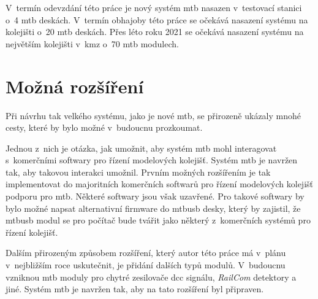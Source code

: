 V~termín odevzdání této práce je nový systém \gls{mtb} nasazen v~testovací
stanici o~4 \gls{mtb} deskách. V~termín obhajoby této práce se očekává nasazení
systému na kolejišti o~20 \gls{mtb} deskách. Přes léto roku 2021 se očekává
nasazení systému na největším kolejišti v~\gls{kmz} o~70 \gls{mtb} modulech.

\section{Možná rozšíření}

Při návrhu tak velkého systému, jako je nové \gls{mtb}, se přirozeně ukázaly
mnohé cesty, které by bylo možné v~budoucnu prozkoumat.

Jednou z~nich je otázka, jak umožnit, aby systém \gls{mtb} mohl interagovat
s~komerčními softwary pro řízení modelových kolejišť. Systém \gls{mtb} je navržen
tak, aby takovou interakci umožnil. Prvním možných rozšířením je tak implementovat
do majoritních komerčních softwarů pro řízení modelových kolejišť podporu
pro \gls{mtb}. Některé softwary jsou však uzavřené. Pro takové softwary by bylo
možné napsat alternativní firmware do \gls{mtbusb} desky, který by zajistil, že
\gls{mtbusb} modul se pro počítač bude tvářit jako některý z~komerčních systémů
pro řízení kolejišť.

Dalším přirozeným způsobem rozšíření, který autor této práce má v~plánu
v~nejbližším roce uskutečnit, je přidání dalších typů modulů. V~budoucnu
vzniknou \gls{mtb} moduly pro chytré zesilovače \gls{dcc} signálu,
\textit{RailCom} detektory a jiné. Systém \gls{mtb} je navržen tak, aby na tato
rozšíření byl připraven.
